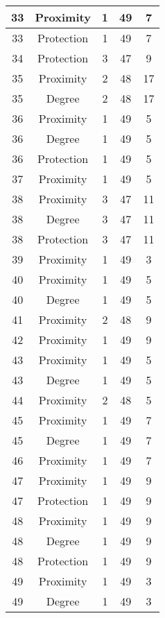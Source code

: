 \documentclass[results.tex]{subfiles}
\begin{document}
\begin{center}
\begin{tabular}{| c || c | c | c | c |}
    \hline
    33 & Proximity & 1 & 49 & 7 \\ 
    \hline
    33 & Protection & 1 & 49 & 7 \\ 
    \hline
    34 & Protection & 3 & 47 & 9 \\ 
    \hline
    35 & Proximity & 2 & 48 & 17 \\ 
    \hline
    35 & Degree & 2 & 48 & 17 \\ 
    \hline
    36 & Proximity & 1 & 49 & 5 \\ 
    \hline
    36 & Degree & 1 & 49 & 5 \\ 
    \hline
    36 & Protection & 1 & 49 & 5 \\ 
    \hline
    37 & Proximity & 1 & 49 & 5 \\ 
    \hline
    38 & Proximity & 3 & 47 & 11 \\ 
    \hline
    38 & Degree & 3 & 47 & 11 \\ 
    \hline
    38 & Protection & 3 & 47 & 11 \\ 
    \hline
    39 & Proximity & 1 & 49 & 3 \\ 
    \hline
    40 & Proximity & 1 & 49 & 5 \\ 
    \hline
    40 & Degree & 1 & 49 & 5 \\ 
    \hline
    41 & Proximity & 2 & 48 & 9 \\ 
    \hline
    42 & Proximity & 1 & 49 & 9 \\ 
    \hline
    43 & Proximity & 1 & 49 & 5 \\ 
    \hline
    43 & Degree & 1 & 49 & 5 \\ 
    \hline
    44 & Proximity & 2 & 48 & 5 \\ 
    \hline
    45 & Proximity & 1 & 49 & 7 \\ 
    \hline
    45 & Degree & 1 & 49 & 7 \\ 
    \hline
    46 & Proximity & 1 & 49 & 7 \\ 
    \hline
    47 & Proximity & 1 & 49 & 9 \\ 
    \hline
    47 & Protection & 1 & 49 & 9 \\ 
    \hline
    48 & Proximity & 1 & 49 & 9 \\ 
    \hline
    48 & Degree & 1 & 49 & 9 \\ 
    \hline
    48 & Protection & 1 & 49 & 9 \\ 
    \hline
    49 & Proximity & 1 & 49 & 3 \\ 
    \hline
    49 & Degree & 1 & 49 & 3 \\ 
    \hline   \end{tabular}
\end{center}
\end{document}
